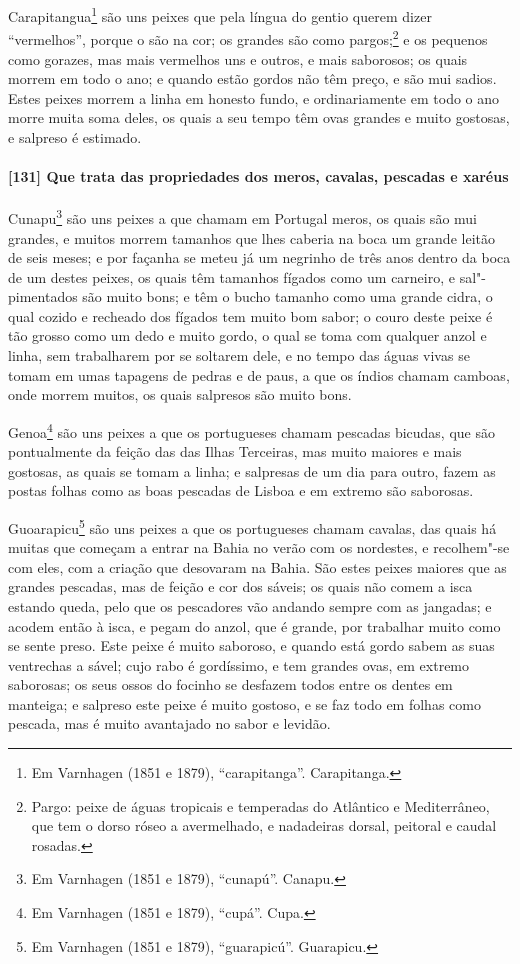 Carapitangua\footnote{ Em Varnhagen (1851 e 1879), ``carapitanga''. Carapitanga.} são uns
peixes que pela língua do gentio querem dizer ``vermelhos'', porque o são na cor; os
grandes são como pargos;\footnote{ Pargo: peixe de águas tropicais e temperadas do
Atlântico e Mediterrâneo, que tem o dorso róseo a avermelhado, e nadadeiras dorsal,
peitoral e caudal rosadas.} e os pequenos como gorazes, mas mais vermelhos uns e outros,
e mais saborosos; os quais morrem em todo o ano; e quando estão gordos não têm preço, e
são mui sadios. Estes peixes morrem a linha em honesto fundo, e ordinariamente em todo o
ano morre muita soma deles, os quais a seu tempo têm ovas grandes e muito gostosas, e
salpreso é estimado.

\paragraph{[131] Que trata das propriedades dos meros, cavalas, pescadas e xaréus}\quad
Cunapu\footnote{ Em Varnhagen (1851 e 1879), ``cunapú''. Canapu.} são uns peixes a que
chamam em Portugal meros, os quais são mui grandes, e muitos morrem tamanhos que lhes
caberia na boca um grande leitão de seis meses; e por façanha se meteu já um negrinho de
três anos dentro da boca de um destes peixes, os quais têm tamanhos fígados como um
carneiro, e sal"-pimentados são muito bons; e têm o bucho tamanho como uma grande cidra, o
qual cozido e recheado dos fígados tem muito bom sabor; o couro deste peixe é tão grosso
como um dedo e muito gordo, o qual se toma com qualquer anzol e linha, sem trabalharem por
se soltarem dele, e no tempo das águas vivas se tomam em umas tapagens de pedras e de
paus, a que os índios chamam camboas, onde morrem muitos, os quais salpresos são muito
bons.

Genoa\footnote{ Em Varnhagen (1851 e 1879), ``cupá''. Cupa.} são uns peixes a que os
portugueses chamam pescadas bicudas, que são pontualmente da feição das das Ilhas
Terceiras, mas muito maiores e mais gostosas, as quais se tomam a linha; e salpresas de um
dia para outro, fazem as postas folhas como as boas pescadas de Lisboa e em extremo são
saborosas.

Guoarapicu\footnote{ Em Varnhagen (1851 e 1879), ``guarapicú''. Guarapicu.} são uns peixes
a que os portugueses chamam cavalas, das quais há muitas que começam a entrar na Bahia no
verão com os nordestes, e recolhem"-se com eles, com a criação que desovaram na Bahia. São
estes peixes maiores que as grandes pescadas, mas de feição e cor dos sáveis; os quais não
comem a isca estando queda, pelo que os pescadores vão andando sempre com as jangadas; e
acodem então à isca, e pegam do anzol, que é grande, por trabalhar muito como se sente
preso. Este peixe é muito saboroso, e quando está gordo sabem as suas ventrechas a sável;
cujo rabo é gordíssimo, e tem grandes ovas, em extremo saborosas; os seus ossos do focinho
se desfazem todos entre os dentes em manteiga; e salpreso este peixe é muito gostoso, e se
faz todo em folhas como pescada, mas é muito avantajado no sabor e levidão.


